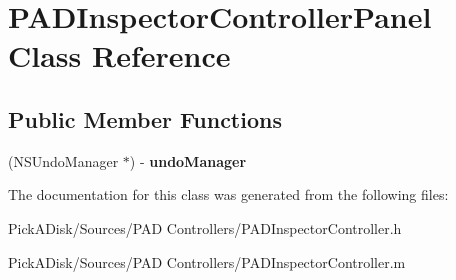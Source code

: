 \hypertarget{interface_p_a_d_inspector_controller_panel}{
\section{PADInspectorControllerPanel Class Reference}
\label{interface_p_a_d_inspector_controller_panel}
}
\subsection*{Public Member Functions}
\begin{DoxyCompactItemize}
\item 
\hypertarget{interface_p_a_d_inspector_controller_panel_a927686e7130b98b4030c6d56a0f7ea4a}{
(NSUndoManager $\ast$) -\/ {\bfseries undoManager}}
\label{interface_p_a_d_inspector_controller_panel_a927686e7130b98b4030c6d56a0f7ea4a}

\end{DoxyCompactItemize}


The documentation for this class was generated from the following files:\begin{DoxyCompactItemize}
\item 
PickADisk/Sources/PAD Controllers/PADInspectorController.h\item 
PickADisk/Sources/PAD Controllers/PADInspectorController.m\end{DoxyCompactItemize}
